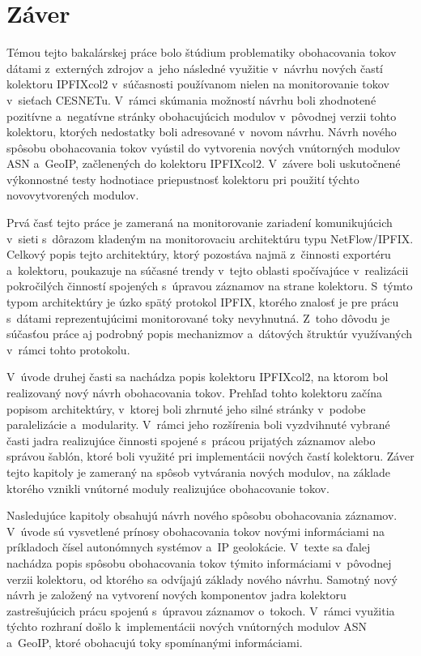 \chapter{Záver}
\label{chpt:zaver}

Témou tejto bakalárskej práce bolo štúdium problematiky obohacovania tokov dátami z~externých zdrojov a~jeho následné využitie v~návrhu nových častí kolektoru IPFIXcol2 v~súčasnosti používanom nielen na monitorovanie tokov v~sieťach
CESNETu. V~rámci skúmania možností návrhu boli zhodnotené pozitívne a~negatívne stránky obohacujúcich modulov v~pôvodnej verzii tohto kolektoru, ktorých nedostatky boli adresované v~novom návrhu. Návrh nového spôsobu obohacovania
tokov vyústil do vytvorenia nových vnútorných modulov ASN a~GeoIP, začlenených do kolektoru IPFIXcol2. V~závere boli uskutočnené výkonnostné testy hodnotiace priepustnosť kolektoru pri použití týchto novovytvorených modulov.

Prvá časť tejto práce je zameraná na monitorovanie zariadení komunikujúcich v~sieti s~dôrazom kladeným na monitorovaciu architektúru typu NetFlow/IPFIX. Celkový popis tejto architektúry, ktorý pozostáva najmä z~činnosti exportéru a~kolektoru,
poukazuje na súčasné trendy v~tejto oblasti spočívajúce v~realizácii pokročilých činností spojených s~úpravou záznamov na strane kolektoru. S~týmto typom architektúry je úzko spätý protokol IPFIX, ktorého znalosť je pre prácu s~dátami
reprezentujúcimi monitorované toky nevyhnutná. Z~toho dôvodu je súčasťou práce aj podrobný popis mechanizmov a~dátových štruktúr využívaných v~rámci tohto protokolu.

V~úvode druhej časti sa nachádza popis kolektoru IPFIXcol2, na ktorom bol realizovaný nový návrh obohacovania tokov. Prehľad tohto kolektoru začína popisom architektúry, v~ktorej boli zhrnuté jeho silné stránky v~podobe paralelizácie a~modularity.
V~rámci jeho rozšírenia boli vyzdvihnuté vybrané časti jadra realizujúce činnosti spojené s~prácou prijatých záznamov alebo správou šablón, ktoré boli využité pri implementácii nových častí kolektoru. Záver tejto kapitoly je zameraný na spôsob vytvárania
nových modulov, na základe ktorého vznikli vnútorné moduly realizujúce obohacovanie tokov.

Nasledujúce kapitoly obsahujú návrh nového spôsobu obohacovania záznamov. V~úvode sú vysvetlené prínosy obohacovania tokov novými informáciami na príkladoch čísel autonómnych systémov a~IP geolokácie. V~texte sa ďalej nachádza
popis spôsobu obohacovania tokov týmito informáciami v~pôvodnej verzii kolektoru, od ktorého sa odvíjajú základy nového návrhu. Samotný nový návrh je založený na vytvorení nových komponentov jadra kolektoru zastrešujúcich prácu
spojenú s~úpravou záznamov o~tokoch. V~rámci využitia týchto rozhraní došlo k~implementácii nových vnútorných modulov ASN a~GeoIP, ktoré obohacujú toky spomínanými informáciami.

